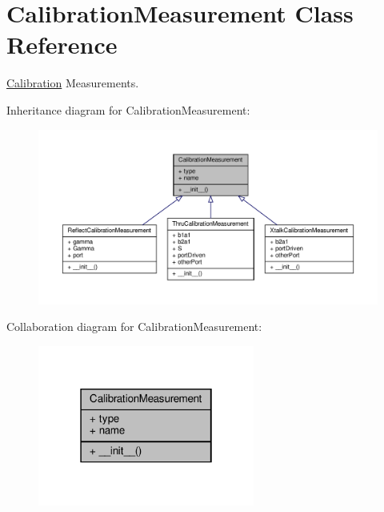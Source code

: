 \hypertarget{classSignalIntegrity_1_1Measurement_1_1Calibration_1_1CalibrationMeasurements_1_1CalibrationMeasurement}{}\section{Calibration\+Measurement Class Reference}
\label{classSignalIntegrity_1_1Measurement_1_1Calibration_1_1CalibrationMeasurements_1_1CalibrationMeasurement}


\hyperlink{namespaceSignalIntegrity_1_1Measurement_1_1Calibration_1_1Calibration}{Calibration} Measurements.  




Inheritance diagram for Calibration\+Measurement\+:
\nopagebreak
\begin{figure}[H]
\begin{center}
\leavevmode
\includegraphics[width=350pt]{classSignalIntegrity_1_1Measurement_1_1Calibration_1_1CalibrationMeasurements_1_1CalibrationMeasurement__inherit__graph}
\end{center}
\end{figure}


Collaboration diagram for Calibration\+Measurement\+:
\nopagebreak
\begin{figure}[H]
\begin{center}
\leavevmode
\includegraphics[width=202pt]{classSignalIntegrity_1_1Measurement_1_1Calibration_1_1CalibrationMeasurements_1_1CalibrationMeasurement__coll__graph}
\end{center}
\end{figure}
